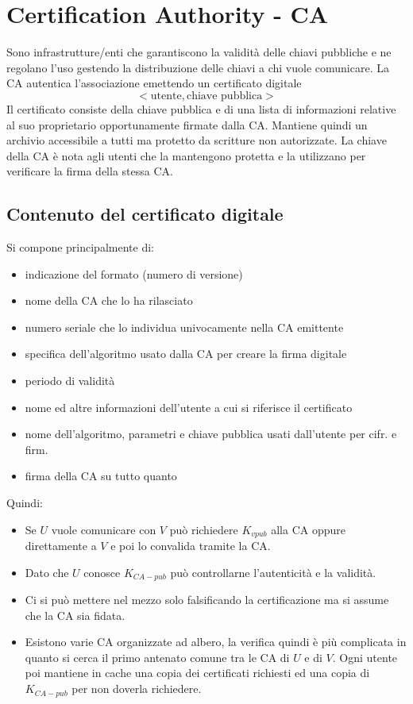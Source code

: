 \section{Certification Authority - CA}
Sono infrastrutture/enti che garantiscono la validità delle chiavi pubbliche e ne regolano l'uso gestendo la distribuzione delle chiavi a chi vuole comunicare.
La CA autentica l'associazione emettendo un certificato digitale$$<\text{utente}, \text{chiave pubblica}>$$ 
Il certificato consiste della chiave pubblica e di una lista di informazioni relative al suo proprietario opportunamente firmate dalla CA. Mantiene quindi un archivio accessibile a tutti ma protetto da scritture non autorizzate. La chiave della CA è nota agli utenti che la mantengono protetta e la utilizzano per verificare la firma della stessa CA.

\subsection{Contenuto del certificato digitale}
Si compone principalmente di:
\begin{itemize}
    \item indicazione del formato (numero di versione)
    \item nome della CA che lo ha rilasciato
    \item numero seriale che lo individua univocamente nella CA emittente
    \pagebreak 
    \item specifica dell'algoritmo usato dalla CA per creare la firma digitale
    \item periodo di validità
    \item nome ed altre informazioni dell'utente a cui si riferisce il certificato
    \item nome dell'algoritmo, parametri e chiave pubblica usati dall'utente per cifr. e firm.
    \item firma della CA su tutto quanto
\end{itemize}
Quindi:
\begin{itemize}
	\item 
	Se $U$ vuole comunicare con $V$ può richiedere $K_{vpub}$ alla CA oppure direttamente a $V$ e poi lo convalida tramite la CA.
	
	\item Dato che $U$ conosce $K_{CA-pub}$ può controllarne l'autenticità e la validità.
	
	\item Ci si può mettere nel mezzo solo falsificando la certificazione ma si assume che la CA sia fidata.
	
	\item Esistono varie CA organizzate ad albero, la verifica quindi è più complicata in quanto si cerca il primo antenato comune tra le CA di $U$ e di $V$. Ogni utente poi mantiene in cache una copia dei certificati richiesti ed una copia di $K_{CA-pub}$ per non doverla richiedere.
\end{itemize}

